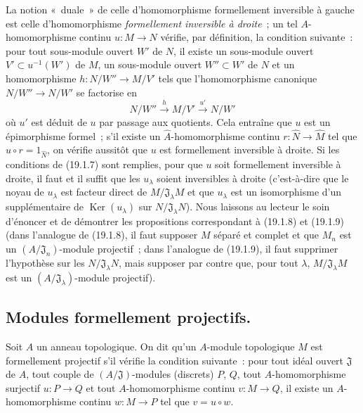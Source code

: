 
\begin{remark}[19.1.15]
\label{0.19.1.15-fr}
La notion «~duale~» de celle d'homomorphisme formellement inversible à gauche
est celle d'homomorphisme \emph{formellement inversible à droite}~; un tel
$A$-homomorphisme continu $u:M\to N$ vérifie, par définition, la condition
suivante~: pour tout sous-module ouvert $W'$ de $N$, il existe un sous-module
ouvert $V'\subset u^{-1}(W')$ de $M$, un sous-module ouvert $W''\subset W'$ de
$N$ et un homomorphisme $h:N/W''\to M/V'$ tels que l'homomorphisme canonique
$N/W''\to N/W'$ se factorise en
\[
  N/W''\xrightarrow{h}M/V'\xrightarrow{u'}N/W'
\]
où $u'$ est déduit de $u$ par passage aux quotients. Cela entraîne que $u$ est
un épimorphisme formel~; s'il existe un $\widehat A$-homomorphisme continu
$r:\widehat N\to\widehat M$ tel que $\widehat u\circ r=1_{\widehat N}$, on
vérifie aussitôt que $u$ est formellement inversible à droite. Si les
conditions de (19.1.7) sont remplies, pour que $u$ soit formellement inversible
à droite, il faut et il suffit que les $u_\lambda$ soient inversibles à droite
(c'est-à-dire que le noyau de $u_\lambda$ est facteur direct de
$M/\mathfrak J_\lambda M$ et que $u_\lambda$ est un isomorphisme d'un
supplémentaire de $\operatorname{Ker}(u_\lambda)$ sur
$N/\mathfrak J_\lambda N$). Nous laissons au lecteur le soin d'énoncer et de
démontrer les propositions correspondant à (19.1.8) et (19.1.9) (dans
l'analogue de (19.1.8), il faut supposer $M$ séparé et complet et que $M_n$ est
un $(A/\mathfrak J_n)$-module projectif~; dans l'analogue de (19.1.9), il faut
supprimer l'hypothèse sur les $N/\mathfrak J_\lambda N$, mais supposer par
contre que, pour tout $\lambda$, $M/\mathfrak J_\lambda M$ est un
$(A/\mathfrak J_\lambda)$-module projectif).
\end{remark}

\subsection{Modules formellement projectifs.}
\label{subsection:0.19.2-fr}

\begin{definition}[19.2.1]
\label{0.19.2.1-fr}
Soit $A$ un anneau topologique. On dit qu'un $A$-module topologique $M$ est
formellement projectif s'il vérifie la condition suivante~: pour tout
idéal ouvert $\mathfrak J$ de $A$, tout couple de $(A/\mathfrak J)$-modules
(discrets) $P$, $Q$, tout $A$-homomorphisme surjectif $u:P\to Q$ et tout
$A$-homomorphisme continu $v:M\to Q$, il existe un $A$-homomorphisme continu
$w:M\to P$ tel que $v=u\circ w$.
\end{definition}

